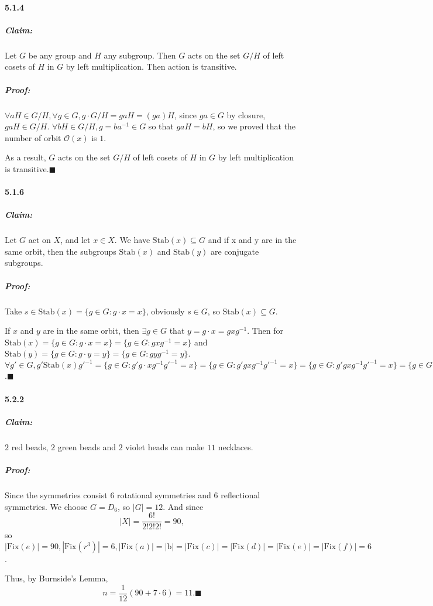 \documentclass[11pt]{article}
\begin{document}
	\paragraph{5.1.4}
		\subparagraph{Claim:}Let $G$ be any group and $H$ any subgroup. Then $G$ acts on the set $G/H$ of left cosets of $H$ in $G$ by left multiplication. Then action is transitive.
		\subparagraph{Proof:} $\forall aH \in G/H, \forall g \in G, g\cdot G/H = gaH = (ga)H$, since $ga \in G$ by closure, $gaH \in G/H$. $\forall bH \in G/H, g = ba^{-1} \in G$ so that $gaH = bH$, so we proved that the number of orbit $\mathcal{O}(x)$ is $1$.
		
		As a result, $G$ acts on the set $G/H$ of left cosets of $H$ in $G$ by left multiplication is transitive.$\blacksquare$
	\paragraph{5.1.6}
		\subparagraph{Claim:}Let $G$ act on $X$, and let $x \in X$. We have $\mathrm{Stab}(x) \subseteq G$ and if x and y are in the same orbit, then the subgroups $\mathrm{Stab}(x)$ and $\mathrm{Stab}(y)$ are conjugate subgroups.
		\subparagraph{Proof:}Take $s \in \mathrm{Stab}(x) = \{g \in G: g\cdot x = x\}$, obviously $s \in G $, so $ \mathrm{Stab}(x) \subseteq G$.
		
			If $x$ and $y$ are in the same orbit, then $\exists g \in G$ that $y = g\cdot x = gxg^{-1}$. Then for $\mathrm{Stab}(x) = \{g \in G: g\cdot x = x\} = \{g \in G: gxg^{-1} = x\}$ and $\mathrm{Stab}(y) = \{g \in G: g\cdot y = y\} = \{g \in G: gyg^{-1} = y\}$. $\forall g' \in G, g'\mathrm{Stab}(x)g'^{-1} = \{g \in G: g'g\cdot xg^{-1}g'^{-1} = x\} = \{g \in G: g'gxg^{-1}g'^{-1} = x\} = \{g \in G: g'gxg^{-1}g'^{-1} = x\} = \{g \in G: g\cdot y = y\} = \mathrm{Stab}(y)$.$\blacksquare$
	\paragraph{5.2.2}
		\subparagraph{Claim:} $2$ red beads, $2$ green beads and $2$ violet heads can make $11$ necklaces.
		\subparagraph{Proof:} Since the symmetries consist $6$ rotational symmetries and $6$ reflectional symmetries. We choose $G = D_6$, so $|G| = 12$. And since \[|X| = \frac{6!}{2!2!2!} = 90,\] so $|\mathrm{Fix}(e)| = 90, |\mathrm{Fix}(r^3)| = 6, |\mathrm{Fix}(a)| = |\mathrm{b}| = |\mathrm{Fix}(c)| = |\mathrm{Fix}(d)| = |\mathrm{Fix}(e)| = |\mathrm{Fix}(f)| = 6$.
		
		Thus, by Burnside's Lemma, \[n = \frac{1}{12}(90 + 7 \cdot 6) = 11.\blacksquare\]	
\end{document}
